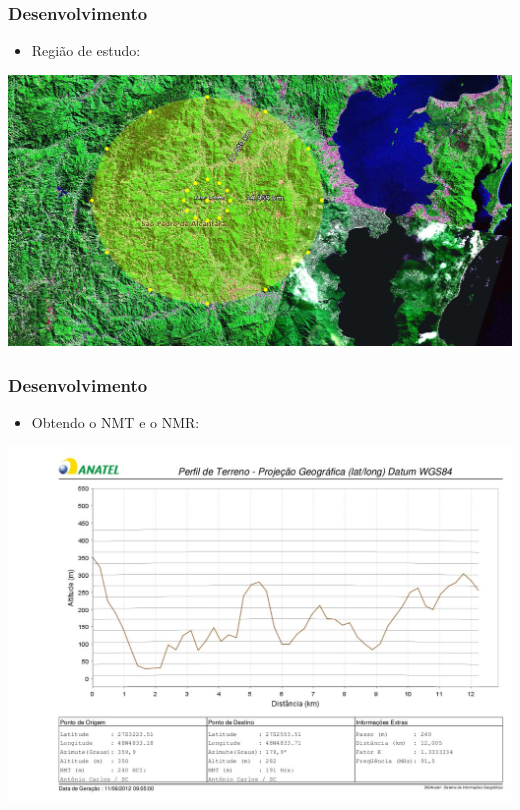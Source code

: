 \documentclass{beamer}
\begin{document}
    
    \begin{frame}
    
      \frametitle{Desenvolvimento}
      \begin{itemize}
	\item  Região de estudo:
      \end{itemize}
     
      \begin{center}
      
           \includegraphics[width=.8\linewidth]{figs/radiais_detalhado.png}		  		
        \end{center}
  
      \end{frame}
    
     \begin{frame}
    
      \frametitle{Desenvolvimento}
      
      \begin{itemize}
	\item Obtendo o NMT e o NMR:
      \end{itemize}
      \begin{center}
      
           \includegraphics[width=.9\linewidth]{figs/nmt1_v2.jpg}		  		
        \end{center}
  
      \end{frame}
      
\end{document}
